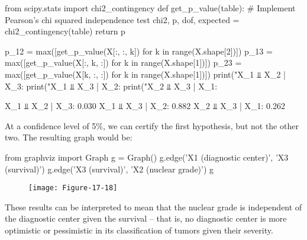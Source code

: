 \begin{python}
from scipy.stats import chi2_contingency
def get_p_value(table):
    # Implement Pearson's chi squared independence test
    chi2, p, dof, expected = chi2_contingency(table)
    return p
\end{python}

\begin{python}
p_12 = max([get_p_value(X[:, :, k]) for k in range(X.shape[2])])
p_13 = max([get_p_value(X[:, k, :]) for k in range(X.shape[1])])
p_23 = max([get_p_value(X[k, :, :]) for k in range(X.shape[1])])
print("X_1 ⫫ X_2 | X_3:  %
print("X_1 ⫫ X_3 | X_2:  %
print("X_2 ⫫ X_3 | X_1:  %
\end{python}
\begin{console}
X_1 ⫫ X_2 | X_3:  0.030
X_1 ⫫ X_3 | X_2:  0.882
X_2 ⫫ X_3 | X_1:  0.262
\end{console}
At a confidence level of 5\%, we can certify the first hypothesis, but
not the other two.
The resulting graph would be:

\begin{python}
from graphviz import Graph
g = Graph()
g.edge('X1 (diagnostic center)', 'X3 (survival)')
g.edge('X3 (survival)', 'X2 (nuclear grade)')
g
\end{python}

\begin{figure}[H]
\centering
\texttt{[image: Figure-17-18]}
\end{figure}
These results can be interpreted to mean that the nuclear grade is
independent of the diagnostic center given the survival -- that is, no
diagnostic center is more optimistic or pessimistic in its
classification of tumors given their severity.
